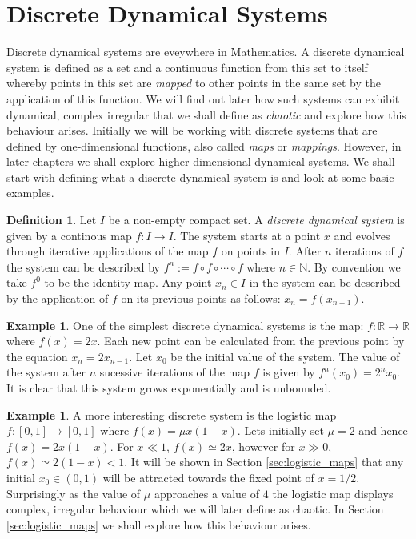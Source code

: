 \documentclass[11pt,a4paper,oneside]{memoir}
\theoremstyle{plain}
\theoremstyle{definition}
\newtheorem{defn}[thm]{Definition}
\newtheorem{exmp}[thm]{Example}
\begin{document}
\section{Discrete Dynamical Systems} \label{sec:dynsys}

Discrete dynamical systems are eveywhere in Mathematics. A discrete dynamical system is defined as a set and a continuous function from this set to itself whereby points in this set are \emph{mapped} to other points in the same set by the application of this function. We will find out later how such systems can exhibit dynamical, complex irregular that we shall define as \emph{chaotic} and explore how this behaviour arises. Initially we will be working with discrete systems that are defined by one-dimensional functions, also called \emph{maps} or \emph{mappings}. However, in later chapters we shall explore higher dimensional dynamical systems. We shall start with defining what a discrete dynamical system is and look at some basic examples.

\begin{defn}
    Let $I$ be a non-empty compact set. A \emph{discrete dynamical system} is given by a continous map $f: I \to I$. The system starts at a point $x$ and evolves through iterative applications of the map $f$ on points in $I$. After $n$ iterations of $f$ the system can be described by $f^n := f \circ f \circ \cdots \circ f$ where $n \in \mathbb{N}$. By convention we take $f^0$ to be the identity map. Any point $x_n \in I$ in the system can be described by the application of $f$ on its previous points as follows: $x_n = f(x_{n-1})$.
\end{defn}

\begin{exmp}
    One of the simplest discrete dynamical systems is the map: $f: \mathbb{R} \to \mathbb{R}$ where $f(x) = 2x$. Each new point can be calculated from the previous point by the equation $x_n = 2x_{n-1}$. Let $x_0$ be the initial value of the system. The value of the system after $n$ sucessive iterations of the map $f$ is given by $f^n(x_0) = 2^nx_0$. It is clear that this system grows exponentially and is unbounded.
\end{exmp}

\begin{exmp}
    A more interesting discrete system is the logistic map $f: [0,1] \to [0,1]$ where $f(x)=\mu x(1-x)$. Lets initially set $\mu = 2$ and hence $f(x) = 2x(1-x)$. For $x \ll 1$, $f(x) \simeq 2x$, however for $x \gg 0$, $f(x) \simeq 2(1-x) < 1$. It will be shown in Section \ref{sec:logistic_maps} that any initial $x_0 \in (0, 1)$ will be attracted towards the fixed point of $x = 1/2$. Surprisingly as the value of $\mu$ approaches a value of $4$ the logistic map displays complex, irregular behaviour which we will later define as chaotic. In Section \ref{sec:logistic_maps} we shall explore how this behaviour arises.
\end{exmp}
\end{document}
